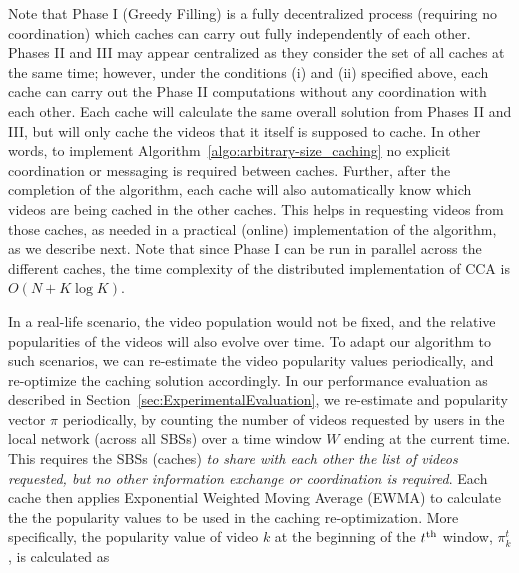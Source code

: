 \documentclass[conference]{IEEEtran}
\begin{document}
Note that Phase I (Greedy Filling) is a fully decentralized process (requiring no coordination) which caches can carry out fully independently of each other. Phases II and III may appear centralized as they consider the set of all caches at the same time; however, under the conditions (i) and (ii) specified above, each cache can carry out the Phase II computations without any coordination with each other. Each cache will calculate the same overall solution from Phases II and III, but will only cache the videos that it itself is supposed to cache. In other words, to implement Algorithm~\ref{algo:arbitrary-size_caching} no explicit coordination or messaging is required between caches. Further, after the completion of the algorithm, each cache will also automatically know which videos are being cached in the other caches. This helps in requesting videos from those caches, as needed in a practical (online) implementation of the algorithm, as we describe next. Note that since Phase I can be run in parallel across the different caches, the time complexity of the distributed implementation of CCA is $O(N + K \log K)$. 

In a real-life scenario, the video population would not be fixed, and the relative popularities of the videos will also evolve over time. To adapt our algorithm to such scenarios, we can re-estimate the video popularity values periodically, and re-optimize the caching solution accordingly. In our performance evaluation as described in Section~\ref{sec:ExperimentalEvaluation}, we re-estimate and popularity vector $\pi$ periodically, by counting the number of videos requested by users in the local network (across all SBSs) over a time window $W$ ending at the current time. This requires the SBSs (caches) \textit{to share with each other the list of videos requested, but no other information exchange or coordination is required}. Each cache then applies Exponential Weighted Moving Average (EWMA) to calculate the the popularity values to be used in the caching re-optimization. More specifically, the popularity value of video $k$ at the beginning of the $t^{\rm th}$ window, $\pi^t_k$, is calculated as
\end{document}
